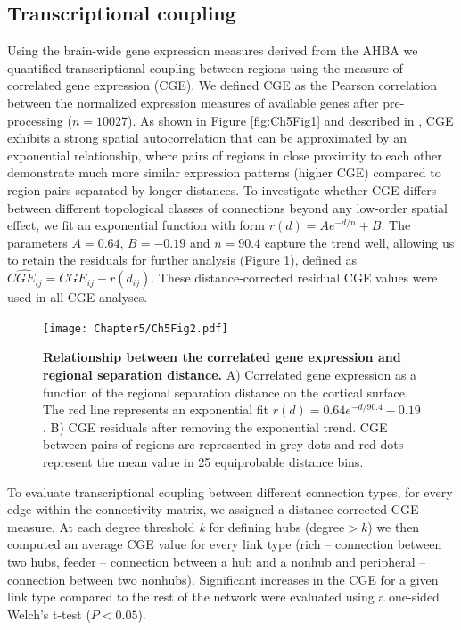 \subsection{Transcriptional coupling}
\label{sec:CGE}

Using the brain-wide gene expression measures derived from the AHBA we quantified transcriptional coupling between regions using the measure of correlated gene expression (CGE). We defined CGE as the Pearson correlation between the normalized expression measures of available genes after pre-processing ($n=\num{10027}$). As shown in Figure \ref{fig:Ch5Fig1} and described in \citep{Arnatkeviciute2019}, CGE exhibits a strong spatial autocorrelation that can be approximated by an exponential relationship, where pairs of regions in close proximity to each other demonstrate much more similar expression patterns (higher CGE) compared to region pairs separated by longer distances. To investigate whether CGE differs between different topological classes of connections beyond any low-order spatial effect, we fit an exponential function with form $r(d)=Ae^{-d/n}+B$. The parameters $A = 0.64$, $B = -0.19$ and $n=90.4$ capture the trend well, allowing us to retain the residuals for further analysis (Figure \ref{fig:Ch5Fig2}), defined as $\widehat{CGE_{ij}}=CGE_{ij} - r(d_{ij})$. These distance-corrected residual CGE values were used in all CGE analyses. 

\begin{figure}[h!]
\begin{center}
\texttt{[image: Chapter5/Ch5Fig2.pdf]}%
\end{center}
\caption{\textbf{Relationship between the correlated gene expression and regional separation distance.} 
A) Correlated gene expression as a function of the regional separation distance on the cortical surface. The red line represents an exponential fit $r(d)=0.64e^{-d/90.4}-0.19$. B) CGE residuals after removing the exponential trend. CGE between pairs of regions are represented in grey dots and red dots represent the mean value in 25 equiprobable distance bins.}
\label{fig:Ch5Fig2}
\end{figure}

To evaluate transcriptional coupling between different connection types, for every edge within the connectivity matrix, we assigned a distance-corrected CGE measure. At each degree threshold \textit{k} for defining hubs (degree$>k$) we then computed an average CGE value for every link type (rich – connection between two hubs, feeder – connection between a hub and a nonhub and peripheral – connection between two nonhubs). Significant increases in the CGE for a given link type compared to the rest of the network were evaluated using a one-sided Welch’s t-test ($P<0.05$). 

